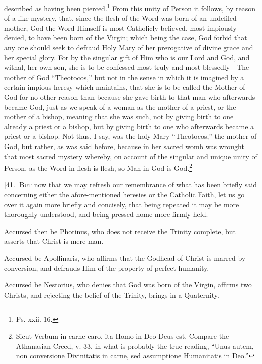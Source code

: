 described as having been pierced.\footnote{Ps. xxii. 16.} From this unity of Person it follows, by reason of a like mystery, that, since the flesh of the Word was born of an undefiled mother, God the Word Himself is most Catholicly believed, most impiously denied, to have been born of the Virgin; which being the case, God forbid that any one should seek to defraud Holy Mary of her prerogative of divine grace and her special glory. For by the singular gift of Him who is our Lord and God, and withal, her own son, she is to be confessed most truly and most blessedly—The mother of God “Theotocos,” but not in the sense in which it is imagined by a certain impious heresy which maintains, that she is to be called the Mother of God for no other reason than because she gave birth to that man who afterwards became God, just as we speak of a woman as the mother of a priest, or the mother of a bishop, meaning that she was such, not by giving birth to one already a priest or a bishop, but by giving birth to one who afterwards became a priest or a bishop. Not thus, I say, was the holy Mary “Theotocos,” the mother of God, but rather, as was said before, because in her sacred womb was wrought that most sacred mystery whereby, on account of the singular and unique unity of Person, as the Word in flesh is flesh, so Man in God is God.\footnote{Sicut Verbum in carne caro, ita Homo in Deo Deus est. Compare the Athanasian Creed, v. 33, in what is probably the true reading, “Unus autem, non conversione Divinitatis in carne, sed assumptione Humanitatis in Deo.”}


[41.] \textsc{But} now that we may refresh our remembrance of what has been briefly said concerning either the afore-mentioned heresies or the Catholic Faith, let us go over it again more briefly and concisely, that being repeated it may be more thoroughly understood, and being pressed home more firmly held.

Accursed then be Photinus, who does not receive the Trinity complete, but asserts that Christ is mere man.

Accursed be Apollinaris, who affirms that the Godhead of Christ is marred by conversion, and defrauds Him of the property of perfect humanity.

Accursed be Nestorius, who denies that God was born of the Virgin, affirms two Christs, and rejecting the belief of the Trinity, brings in a Quaternity.

